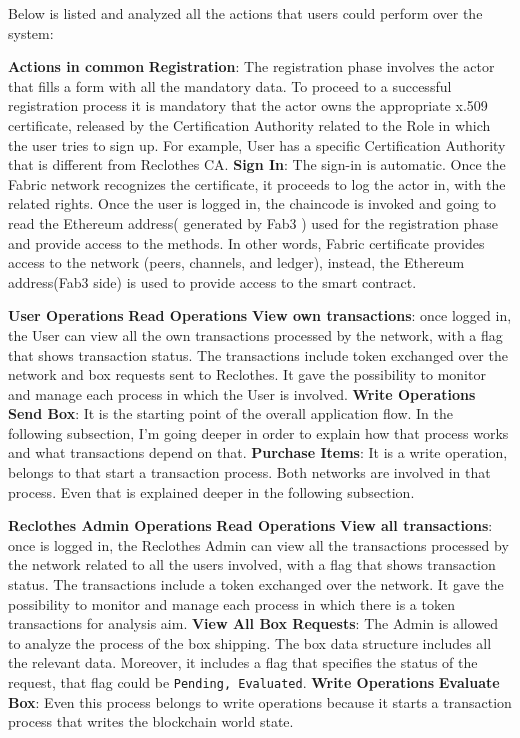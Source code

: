 Below is listed and analyzed all the actions that users could perform over the system:
\begin{outline}
    \1 \textbf{Actions in common}
    \2 \textbf{Registration}: The registration phase involves the actor that fills a form with all the 
    mandatory data. To proceed to a successful registration process it is mandatory that the actor
    owns the appropriate x.509 certificate, released by the Certification Authority related to the Role
    in which the user tries to sign up. For example, User has a specific Certification Authority that is
    different from Reclothes CA. 
    \2 \textbf{Sign In}: The sign-in is automatic. Once the Fabric network recognizes the certificate, 
    it proceeds to log the actor in, with the related rights. Once the user is logged in, the chaincode 
    is invoked and going to read the Ethereum address( generated by Fab3 ) used for the registration phase 
    and provide access to the methods. In other words, Fabric certificate provides access to the network 
    (peers, channels, and ledger), instead, the Ethereum address(Fab3 side) is used to provide access to 
    the smart contract. 
    
    \1 \textbf{User Operations}
    \2 \textbf{Read Operations}
    \3 \textbf{View own transactions}: once logged in, the User can view all the own transactions 
    processed by the network, with a flag that shows transaction status. The transactions include token 
    exchanged over the network and box requests sent to Reclothes. It gave the possibility to monitor and 
    manage each process in which the User is involved. 
    \2 \textbf{Write Operations}
    \3 \textbf{Send Box}: It is the starting point of the overall application flow. In the following 
    subsection, I'm going deeper in order to explain how that process works and what transactions depend 
    on that.
    \3 \textbf{Purchase Items}: It is a write operation, belongs to that start a transaction process. 
    Both networks are involved in that process. Even that is explained deeper in the following subsection.

    \1 \textbf{Reclothes Admin Operations}
    \2 \textbf{Read Operations}
    \3 \textbf{View all transactions}: once is logged in, the Reclothes Admin can view all the transactions 
    processed by the network related to all the users involved, with a flag that shows transaction status. 
    The transactions include a token exchanged over the network. It gave the possibility to monitor and manage 
    each process in which there is a token transactions for analysis aim.
    \3 \textbf{View All Box Requests}: The Admin is allowed to analyze the process of the box shipping.
    The box data structure includes all the relevant data. Moreover, it includes a flag that specifies the status
    of the request, that flag could be \texttt{Pending, Evaluated}. 
    \2 \textbf{Write Operations}
    \3 \textbf{Evaluate Box}: Even this process belongs to write operations because it starts a transaction process 
    that writes the blockchain world state. 

\end{outline}


